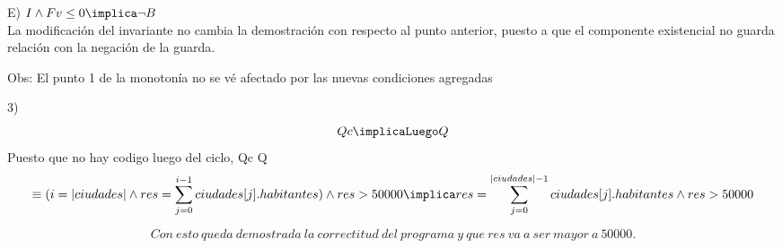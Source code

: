 \documentclass[10pt,a4paper]{article}
\begin{document}
E) $I \land Fv \leq 0 \implica \neg B$\\ La modificación del invariante no cambia la demostración con respecto al punto anterior, puesto a que el componente existencial no guarda relación con la negación de la guarda.

Obs: El punto 1 de la monotonía no se vé afectado por las nuevas condiciones agregadas

3) \[Qc \implicaLuego Q\]
Puesto que no hay codigo luego del ciclo, Qc \implica Q 
\[\equiv (i=|ciudades| \land res ={\sum\limits_{j=0}^{i-1}ciudades[j].habitantes}) \land res>50000 \implica res = {\sum\limits_{j=0}^{|ciudades|-1}ciudades[j].habitantes} \land res>50000\\\]

\[Con\ esto\ queda\ demostrada\ la\ correctitud\ del\ programa\ y\ que\ res\ va\ a\ ser\ mayor\ a\ 50000.\]
\end{document}
